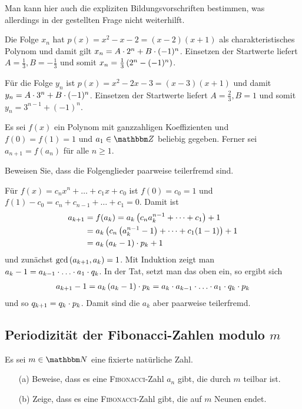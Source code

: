 \documentclass[11pt,a4paper]{article}
\begin{document}
Man kann hier auch die expliziten Bildungsvorschriften bestimmen, was
allerdings in der gestellten Frage nicht weiterhilft. 

Die Folge $x_n$ hat $p(x)=x^2-x-2=(x-2)(x+1)$ als charakteristisches Polynom
und damit gilt $x_n=A\cdot2^n+B\cdot(-1)^n$.  Einsetzen der Startwerte liefert
$A=\frac13, B=-\frac13$ und somit $x_n=\frac13\left(2^n-(-1)^n\right)$.

Für die Folge $y_n$ ist $p(x)=x^2-2x-3=(x-3)(x+1)$ und damit
$y_n=A\cdot3^n+B\cdot(-1)^n$.  Einsetzen der Startwerte liefert $A=\frac23, B=1$ und
somit $y_n=3^{n-1}+(-1)^n$.

\begin{aufgabe} 
Es sei $f(x) $ ein Polynom mit ganzzahligen Koeffizienten und $f(0)=f(1)=1$ und
$a_1\in \Z $ beliebig gegeben.  Ferner sei $a_{n+1} =f(a_n)$ für alle $n\ge 1$.

Beweisen Sie, dass die Folgenglieder paarweise teilerfremd sind.
\end{aufgabe}

\begin{loesung}
  Für $f(x)=c_nx^n+\dots+c_1x+c_0$ ist $f(0)=c_0=1$ und
  $f(1)-c_0=c_n+c_{n-1}+\dots+c_1=0$.  Damit ist
\begin{align*}
  a_{k+1}&=f(a_k)=a_k\left(c_na_k^{n-1}+\dots+c_1\right)+1\\
  &=a_k\left(c_n\left(a_k^{n-1}-1\right)+\dots+c_1(1-1)\right)+1\\
  &=a_k\left(a_k-1\right)\cdot p_k+1
\end{align*}
und zunächst $\gcd\left(a_{k+1},a_k\right)=1$.  Mit Induktion zeigt man
$a_k-1=a_{k-1}\m\dots\m a_1\m q_k$.  In der Tat, setzt man das oben ein, so
ergibt sich 
\begin{gather*}
  a_{k+1}-1=a_k\br{a_k-1}\m p_k=a_k\m a_{k-1}\m\dots\m a_1\m q_k\m p_k
\end{gather*}
und so $q_{k+1}=q_k\cdot p_k$.  Damit sind die $a_k$ aber paarweise
teilerfremd. 
\end{loesung}

\subsection{Periodizität der Fibonacci-Zahlen modulo $m$}

\begin{aufgabe} Es sei $m\in \N $ eine fixierte natürliche Zahl.
  \begin{itemize}
  \item[(a)] Beweise, dass es eine \textsc{Fibonacci}-Zahl $a_n$ gibt, die
    durch $m$ teilbar ist.

  \item[(b)] Zeige, dass es eine \textsc{Fibonacci}-Zahl gibt, die auf $m$
    Neunen endet.
  \end{itemize}
\end{aufgabe}
\end{document}
